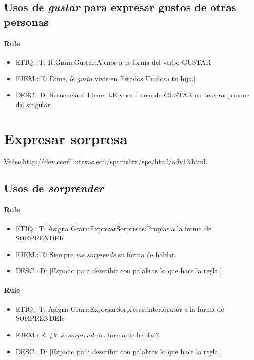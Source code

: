 \documentclass[11pt]{report}
\begin{document}
\subsection{Usos de \emph{gustar} para expresar gustos de otras personas}
\paragraph*{Rule}
\begin{itemize}
\item ETIQ.:  T: R:Gram:Gustar:Ajenos a la forma del verbo GUSTAR
\item EJEM.:  E: Dime, \emph{le gusta} vivir en Estados Unidosa tu hijo.] 
\item DESC.:  D: Secuencia del lema LE y un forma de GUSTAR en tercera persona del singular.
\end{itemize}

\section{Expresar sorpresa}
Veáse \url{http://dev.coerll.utexas.edu/spanishtx/spe/html/adv13.html}.

\subsection{Usos de \emph{sorprender}}
\paragraph*{Rule}
\begin{itemize}
\item ETIQ.:  T: Asigna Gram:ExpresarSorpresas:Propias a la forma de SORPRENDER
\item EJEM.:  E: Siempre \emph{me sorprende} su forma de hablar.
\item DESC.:  D: [Espacio para describir con palabras lo que hace la regla.]
\end{itemize}

\paragraph*{Rule}
\begin{itemize}
\item ETIQ.:  T: Asigna Gram:ExpresarSorpresas:Interlocutor a la forma de SORPRENDER
\item EJEM.:  E: ¿Y \emph{te sorprende} su forma de hablar?
\item DESC.:  D: [Espacio para describir con palabras lo que hace la regla.]
\end{itemize}
\end{document}
